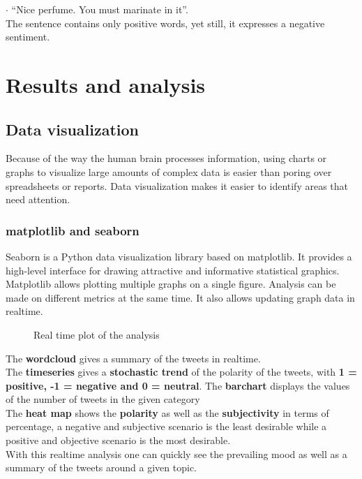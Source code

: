 $\cdot$ “Nice perfume. You must marinate in it”.\\
The sentence contains only positive words, yet still, it expresses a negative sentiment.






\chapter{Results and analysis}\label{ch:Results}
\section{Data visualization}
Because of the way the human brain processes information, using charts or graphs to visualize large amounts of complex data is easier than poring over spreadsheets or reports. 
Data visualization makes it easier to identify areas that need attention.

\subsection{matplotlib and seaborn}
Seaborn is a Python data visualization library based on matplotlib. It provides a high-level interface for drawing attractive and informative statistical graphics.
Matplotlib allows plotting multiple graphs on a single figure. Analysis can be made on different metrics at the same time. It also allows updating graph data in realtime.
\clearpage
\begin{figure}[h]
  \centering
  \caption[Real time plot of the analysis]
  {Real time plot of the analysis}
  \label{fig:ALAP:sm1}
\end{figure}


The \textbf{wordcloud} gives a summary of the tweets in realtime.\\
The \textbf{timeseries} gives a \textbf{stochastic trend} of the polarity of the tweets, with \textbf{1 = positive, -1 = negative and 0 = neutral}.
The \textbf{barchart} displays the values of the number of tweets in the given category\\
The \textbf{heat map} shows the \textbf{polarity} as well as the \textbf{subjectivity} in terms of percentage,
a negative and subjective scenario is the least desirable while a positive and objective scenario is the most desirable.\\

With this realtime analysis one can quickly see the prevailing mood as well as a summary of the tweets around a given topic.





